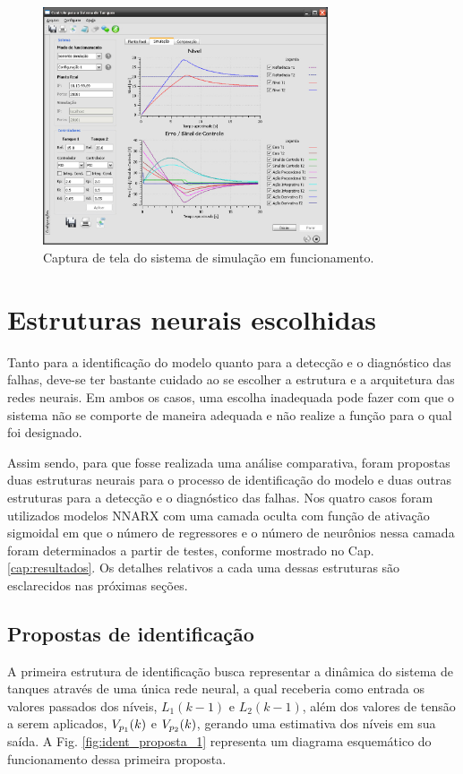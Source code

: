 \begin{figure}[htb]
\centering
    \includegraphics[width=0.75\textwidth]{imgs/sistema/eps/captura}
    \caption{Captura de tela do sistema de simulação em funcionamento.}
    \label{fig:captura}
\end{figure}

\section{Estruturas neurais escolhidas}
Tanto para a identificação do modelo quanto para a detecção e o diagnóstico das
falhas, deve-se ter bastante cuidado ao se escolher a estrutura e a arquitetura
das redes neurais. Em ambos os casos, uma escolha inadequada pode fazer com que
o sistema não se comporte de maneira adequada e não realize a função para o qual
foi designado. 

Assim sendo, para que fosse realizada uma análise comparativa, foram propostas
duas estruturas neurais para o processo de identificação do modelo e duas outras
estruturas para a detecção e o diagnóstico das falhas. Nos quatro casos foram
utilizados modelos NNARX com uma camada oculta com função de ativação sigmoidal
em que o número de regressores e o número de neurônios nessa camada foram
determinados a partir de testes, conforme mostrado no Cap. \ref{cap:resultados}.
Os detalhes relativos a cada uma dessas estruturas são esclarecidos nas próximas
seções.

\subsection{Propostas de identificação}
A primeira estrutura de identificação busca representar a dinâmica do sistema de
tanques através de uma única rede neural, a qual receberia como entrada os
valores passados dos níveis, $L_1(k-1)$ e $L_2(k-1)$, além dos valores de tensão
a serem aplicados, $V_{p_{\tiny 1}}(k)$ e $V_{p_{\tiny 2}}(k)$, gerando uma
estimativa dos níveis em sua saída. A Fig.  \ref{fig:ident_proposta_1}
representa um diagrama esquemático do funcionamento dessa primeira proposta.

